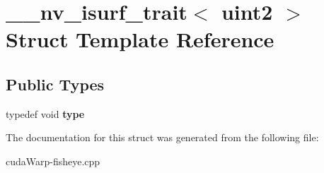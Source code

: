 \hypertarget{struct____nv__isurf__trait_3_01uint2_01_4}{}\section{\+\_\+\+\_\+nv\+\_\+isurf\+\_\+trait$<$ uint2 $>$ Struct Template Reference}
\label{struct____nv__isurf__trait_3_01uint2_01_4}
\subsection*{Public Types}
\begin{DoxyCompactItemize}
\item 
typedef void {\bfseries type}\hypertarget{struct____nv__isurf__trait_3_01uint2_01_4_abf658248dcbf35ca07f4b80c993d7193}{}\label{struct____nv__isurf__trait_3_01uint2_01_4_abf658248dcbf35ca07f4b80c993d7193}

\end{DoxyCompactItemize}


The documentation for this struct was generated from the following file\+:\begin{DoxyCompactItemize}
\item 
cuda\+Warp-\/fisheye.\+cpp\end{DoxyCompactItemize}

